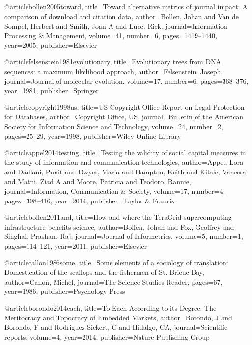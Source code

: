 @article{bollen2005toward,
  title={Toward alternative metrics of journal impact: A comparison of download and citation data},
  author={Bollen, Johan and Van de Sompel, Herbert and Smith, Joan A and Luce, Rick},
  journal={Information Processing \& Management},
  volume={41},
  number={6},
  pages={1419--1440},
  year={2005},
  publisher={Elsevier}
}

@article{felsenstein1981evolutionary,
  title={Evolutionary trees from DNA sequences: a maximum likelihood approach},
  author={Felsenstein, Joseph},
  journal={Journal of molecular evolution},
  volume={17},
  number={6},
  pages={368--376},
  year={1981},
  publisher={Springer}
}

@article{copyright1998us,
  title={US Copyright Office Report on Legal Protection for Databases},
  author={Copyright Office, US},
  journal={Bulletin of the American Society for Information Science and Technology},
  volume={24},
  number={2},
  pages={25--29},
  year={1998},
  publisher={Wiley Online Library}
}

@article{appel2014testing,
  title={Testing the validity of social capital measures in the study of information and communication technologies},
  author={Appel, Lora and Dadlani, Punit and Dwyer, Maria and Hampton, Keith and Kitzie, Vanessa and Matni, Ziad A and Moore, Patricia and Teodoro, Rannie},
  journal={Information, Communication \& Society},
  volume={17},
  number={4},
  pages={398--416},
  year={2014},
  publisher={Taylor \& Francis}
}



@article{bollen2011and,
  title={How and where the TeraGrid supercomputing infrastructure benefits science},
  author={Bollen, Johan and Fox, Geoffrey and Singhal, Prashant Raj},
  journal={Journal of Informetrics},
  volume={5},
  number={1},
  pages={114--121},
  year={2011},
  publisher={Elsevier}
}

@article{callon1986some,
  title={Some elements of a sociology of translation: Domestication of the scallops and the fishermen of St. Brieuc Bay},
  author={Callon, Michel},
  journal={The Science Studies Reader},
  pages={67},
  year={1986},
  publisher={Psychology Press}
}




@article{borondo2014each,
  title={To Each According to its Degree: The Meritocracy and Topocracy of Embedded Markets},
  author={Borondo, J and Borondo, F and Rodriguez-Sickert, C and Hidalgo, CA},
  journal={Scientific reports},
  volume={4},
  year={2014},
  publisher={Nature Publishing Group}
}


